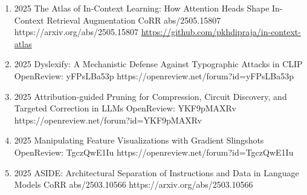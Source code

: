 {\begin{enumerate}
             
        \item {}
                        {2025}
                        {The Atlas of In-Context Learning: How Attention Heads Shape In-Context Retrieval Augmentation}
                        {CoRR abs/2505.15807}
                        {https://arxiv.org/abs/2505.15807}
                        {
                            \href{https://github.com/pkhdipraja/in-context-atlas}{https://github.com/pkhdipraja/in-context-atlas}
                        }
                        
                        
        \item {}
                        {2025}
                        {Dyslexify: A Mechanistic Defense Against Typographic Attacks in CLIP}
                        {OpenReview: yFPsLBa53p}
                        {https://openreview.net/forum?id=yFPsLBa53p}   
                        
                        
                        
        \item {}
                        {2025}
                        {Attribution-guided Pruning for Compression, Circuit Discovery, and Targeted Correction in LLMs}
                        {OpenReview: YKF9pMAXRv}
                        {https://openreview.net/forum?id=YKF9pMAXRv}    
                        
                        
    
        \item {}
                        {2025}
                        {Manipulating Feature Visualizations with Gradient Slingshots}
                        {OpenReview: TgczQwE1Iu}
                        {https://openreview.net/forum?id=TgczQwE1Iu}    
    
    
        \item {}
                        {2025}
                        {ASIDE: Architectural Separation of Instructions and Data in Language Models}
                        {CoRR abs/2503.10566}
                        {https://arxiv.org/abs/2503.10566}    


\end{enumerate}}
